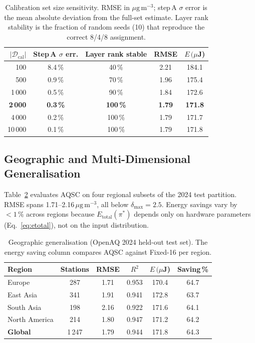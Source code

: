 \documentclass[12pt,a4paper]{article}
\begin{document}
\begin{table}[ht]
\centering
\caption{Calibration set size sensitivity.
RMSE in $\mu\mathrm{g\,m^{-3}}$; step\,A $\sigma$ error is the
mean absolute deviation from the full-set estimate.
Layer rank stability is the fraction of random seeds (10) that
reproduce the correct 8/4/8 assignment.}
\label{tab:calib}
\setlength{\tabcolsep}{5pt}
\begin{tabular}{@{}rcccc@{}}
\toprule
$|\mathcal{D}_\mathrm{cal}|$ & Step\,A $\sigma$ err. & Layer rank stable & RMSE & $E\,(\mu$J) \\
\midrule
100    & 8.4\,\%  & 40\,\%  & 2.21 & 184.1 \\
500    & 0.9\,\%  & 70\,\%  & 1.96 & 175.4 \\
1\,000 & 0.5\,\%  & 90\,\%  & 1.84 & 172.6 \\
\textbf{2\,000} & \textbf{0.3\,\%}  & \textbf{100\,\%} & \textbf{1.79} & \textbf{171.8} \\
4\,000 & 0.2\,\%  & 100\,\% & 1.79 & 171.7 \\
10\,000& 0.1\,\%  & 100\,\% & 1.79 & 171.8 \\
\bottomrule
\end{tabular}
\end{table}

\subsection{Geographic and Multi-Dimensional Generalisation}
\label{sec:geo}

Table~\ref{tab:geo} evaluates AQSC on four regional subsets of the
2024 test partition.
RMSE spans 1.71--2.16\,$\mu\mathrm{g\,m^{-3}}$, all below
$\delta_\mathrm{max}=2.5$.
Energy savings vary by $<1\,\%$ across regions because
$E_\mathrm{total}(\pi^*)$ depends only on hardware parameters
(Eq.~\eqref{eq:etotal}), not on the input distribution.

\begin{table}[ht]
\centering
\caption{Geographic generalisation (OpenAQ 2024 held-out test set).
The energy saving column compares AQSC against Fixed-16 per region.}
\label{tab:geo}
\setlength{\tabcolsep}{4.5pt}
\begin{tabular}{@{}lccccc@{}}
\toprule
\textbf{Region} & Stations & RMSE & $R^2$ & $E\,(\mu$J) & Saving\,\% \\
\midrule
Europe        & 287   & 1.71 & 0.953 & 170.4 & 64.7 \\
East Asia     & 341   & 1.91 & 0.941 & 172.8 & 63.7 \\
South Asia    & 198   & 2.16 & 0.922 & 171.6 & 64.1 \\
North America & 214   & 1.80 & 0.947 & 171.2 & 64.2 \\
\midrule
\textbf{Global} & 1\,247 & 1.79 & 0.944 & 171.8 & 64.3 \\
\bottomrule
\end{tabular}
\end{table}
\end{document}
